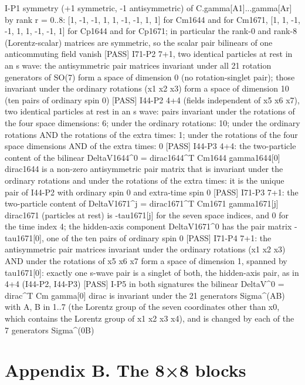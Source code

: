 \documentclass[
  10pt,
]{article}
\newenvironment{Shaded}{}{}
\newcommand{\NormalTok}[1]{#1}
\begin{document}
\begin{Shaded}
\begin{Highlighting}[]
\NormalTok{[PASS] I{-}P1    symmetry (+1 symmetric, {-}1 antisymmetric) of C.gamma[A1]...gamma[Ar] by rank r = 0..8: [1, {-}1, {-}1, 1, 1, {-}1, {-}1, 1, 1] for Cm1644 and for Cm1671, [1, 1, {-}1, {-}1, 1, 1, {-}1, {-}1, 1] for Cp1644 and for Cp1671; in particular the rank{-}0 and rank{-}8 (Lorentz{-}scalar) matrices are symmetric, so the scalar pair bilinears of one anticommuting field vanish}
\NormalTok{[PASS] I71{-}P2  7+1, two identical particles at rest in an s wave: the antisymmetric pair matrices invariant under all 21 rotation generators of SO(7) form a space of dimension 0 (no rotation{-}singlet pair); those invariant under the ordinary rotations (x1 x2 x3) form a space of dimension 10 (ten pairs of ordinary spin 0)}
\NormalTok{[PASS] I44{-}P2  4+4 (fields independent of x5 x6 x7), two identical particles at rest in an s wave: pairs invariant under the rotations of the four space dimensions: 6; under the ordinary rotations: 10; under the ordinary rotations AND the rotations of the extra times: 1; under the rotations of the four space dimensions AND of the extra times: 0}
\NormalTok{[PASS] I44{-}P3  4+4: the two{-}particle content of the bilinear DeltaV1644\^{}0 = dirac1644\^{}T Cm1644 gamma1644[0] dirac1644 is a non{-}zero antisymmetric pair matrix that is invariant under the ordinary rotations and under the rotations of the extra times: it is the unique pair of I44{-}P2 with ordinary spin 0 and extra{-}time spin 0}
\NormalTok{[PASS] I71{-}P3  7+1: the two{-}particle content of DeltaV1671\^{}j = dirac1671\^{}T Cm1671 gamma1671[j] dirac1671 (particles at rest) is {-}tau1671[j] for the seven space indices, and 0 for the time index 4; the hidden{-}axis component DeltaV1671\^{}0 has the pair matrix {-}tau1671[0], one of the ten pairs of ordinary spin 0}
\NormalTok{[PASS] I71{-}P4  7+1: the antisymmetric pair matrices invariant under the ordinary rotations (x1 x2 x3) AND under the rotations of x5 x6 x7 form a space of dimension 1, spanned by tau1671[0]: exactly one s{-}wave pair is a singlet of both, the hidden{-}axis pair, as in 4+4 (I44{-}P2, I44{-}P3)}
\NormalTok{[PASS] I{-}P5    in both signatures the bilinear DeltaV\^{}0 = dirac\^{}T Cm gamma[0] dirac is invariant under the 21 generators Sigma\^{}(AB) with A, B in 1..7 (the Lorentz group of the seven coordinates other than x0, which contains the Lorentz group of x1 x2 x3 x4), and is changed by each of the 7 generators Sigma\^{}(0B)}
\end{Highlighting}
\end{Shaded}

\hypertarget{appendix-b.-the-88-blocks}{%
\section{Appendix B. The 8×8 blocks}\label{appendix-b.-the-88-blocks}}
\end{document}
